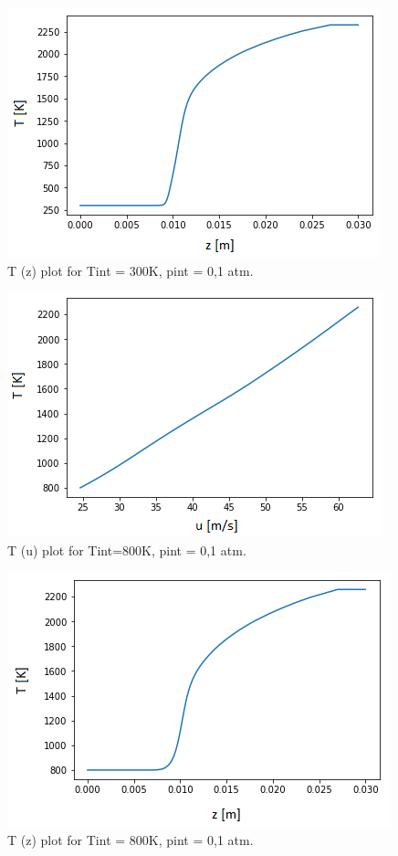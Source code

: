 \documentclass[11pt]{article}
\begin{document}
\begin{figure} [H]
	\begin{center}
\includegraphics[height=0.5\textwidth]{P6}
        \caption{T (z) plot for Tint = 300K, pint = 0,1 atm.}
    \end{center}
\end{figure}

\begin{figure} [H]
	\begin{center}
\includegraphics[height=0.5\textwidth]{P7}
        \caption{T (u) plot for Tint=800K, pint = 0,1 atm.}
    \end{center}
\end{figure}

\begin{figure} [H]
	\begin{center}
\includegraphics[height=0.5\textwidth]{P8}
        \caption{T (z) plot for Tint = 800K, pint = 0,1 atm.}
    \end{center}
\end{figure}
\end{document}
